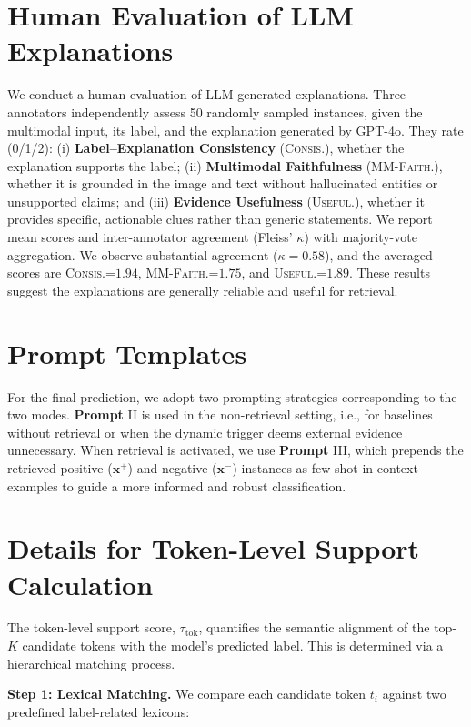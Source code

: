 \section{Human Evaluation of LLM Explanations}
\label{appendix:human_verify}
We conduct a human evaluation of LLM-generated explanations. Three annotators independently assess 50 randomly sampled instances, given the multimodal input, its label, and the explanation generated by GPT-4o. They rate (0/1/2): (i) \textbf{Label--Explanation Consistency} (\textsc{Consis.}), whether the explanation supports the label; (ii) \textbf{Multimodal Faithfulness} (\textsc{MM-Faith.}), whether it is grounded in the image and text without hallucinated entities or unsupported claims; and (iii) \textbf{Evidence Usefulness} (\textsc{Useful.}), whether it provides specific, actionable clues rather than generic statements. We report mean scores and inter-annotator agreement (Fleiss' $\kappa$) with majority-vote aggregation. We observe substantial agreement ($\kappa{=}0.58$), and the averaged scores are \textsc{Consis.}=$\mathbf{1.94}$, \textsc{MM-Faith.}=$\mathbf{1.75}$, and \textsc{Useful.}=$\mathbf{1.89}$. These results suggest the explanations are generally reliable and useful for retrieval.


\section{Prompt Templates}
\label{sec:appendix_prompting}
For the final prediction, we adopt two prompting strategies corresponding to the two modes. \textbf{Prompt} \textsc{II} is used in the non-retrieval setting, i.e., for baselines without retrieval or when the dynamic trigger deems external evidence unnecessary. When retrieval is activated, we use \textbf{Prompt} \textsc{III}, which prepends the retrieved positive ($\mathbf{x}^{+}$) and negative ($\mathbf{x}^{-}$) instances as few-shot in-context examples to guide a more informed and robust classification.




\section{Details for Token-Level Support Calculation}
\label{appendix:Lexicons}
The token-level support score, $\tau_{\text{tok}}$, quantifies the semantic alignment of the top-$K$ candidate tokens with the model's predicted label. This is determined via a hierarchical matching process.

\noindent\textbf{Step 1: Lexical Matching.} We compare each candidate token $t_i$ against  two predefined label-related lexicons:

